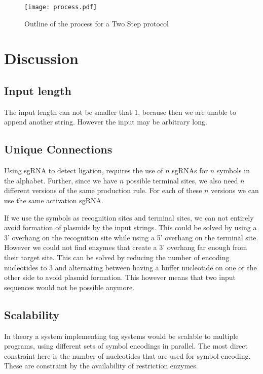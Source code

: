 \documentclass[
11pt, %
a4paper, %
oneside, %
headinclude,footinclude, %
BCOR5mm, %
]{scrartcl}
\begin{document}
\begin{figure}[h]
  \texttt{[image: process.pdf]}
  \caption{Outline of the process for a Two Step protocol}
\end{figure}


\section{Discussion}

\subsection{Input length}

The input length can not be smaller that 1, because then we are unable to append
another string. However the input may be arbitrary long.

\subsection{Unique Connections}

Using sgRNA to detect ligation, requires the use of $n$ sgRNAs for $n$ symbols
in the alphabet. Further, since we have $n$ possible terminal sites, we also
need $n$ different versions of the same production rule. For each of these $n$
versions we can use the same activation sgRNA.

If we use the symbols as recognition sites and terminal sites, we can not
entirely avoid formation of plasmids by the input strings. This could be solved
by using a 3' overhang on the recognition site while using a 5' overhang on the
terminal site. However we could not find enzymes that create a 3' overhang far
enough from their target site. This can be solved by reducing the number of
encoding nucleotides to 3 and alternating between having a buffer nucleotide on
one or the other side to avoid plasmid formation. This however means that two
input sequences would not be possible anymore.

\subsection{Scalability}

In theory a system implementing tag systems would be scalable to multiple
programs, using different sets of symbol encodings in parallel. The most direct
constraint here is the number of nucleotides that are used for symbol encoding.
These are constraint by the availability of restriction enzymes.
\end{document}
